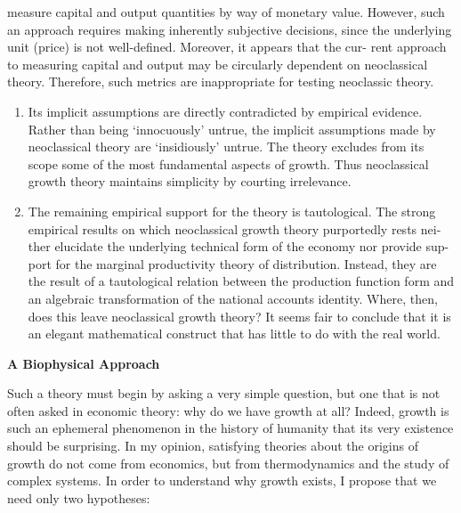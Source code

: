 \documentclass[
]{book}
\begin{document}
measure capital and output quantities by way of monetary value. However,
such an approach requires making inherently subjective decisions, since the
underlying unit (price) is not well-defined. Moreover, it appears that the cur-
rent approach to measuring capital and output may be circularly dependent
on neoclassical theory. Therefore, such metrics are inappropriate for testing
neoclassic theory.

\begin{enumerate}
\def\labelenumi{\arabic{enumi}.}
\setcounter{enumi}{2}
\item
  Its implicit assumptions are directly contradicted by empirical evidence.
  Rather than being `innocuously' untrue, the implicit assumptions made by
  neoclassical theory are `insidiously' untrue. The theory excludes from its
  scope some of the most fundamental aspects of growth. Thus neoclassical
  growth theory maintains simplicity by courting irrelevance.
\item
  The remaining empirical support for the theory is tautological. The strong
  empirical results on which neoclassical growth theory purportedly rests nei-
  ther elucidate the underlying technical form of the economy nor provide sup-
  port for the marginal productivity theory of distribution. Instead, they are the
  result of a tautological relation between the production function form and an
  algebraic transformation of the national accounts identity.
  Where, then, does this leave neoclassical growth theory? It seems fair to conclude
  that it is an elegant mathematical construct that has little to do with the real world.
\end{enumerate}

\textbf{A Biophysical Approach}

Such a theory must begin by asking a very simple
question, but one that is not often asked in economic theory: why do we have growth
at all? Indeed, growth is such an ephemeral phenomenon in the history of humanity
that its very existence should be surprising. In my opinion, satisfying theories about
the origins of growth do not come from economics, but from thermodynamics and
the study of complex systems. In order to understand why growth exists, I propose
that we need only two hypotheses:
\end{document}
